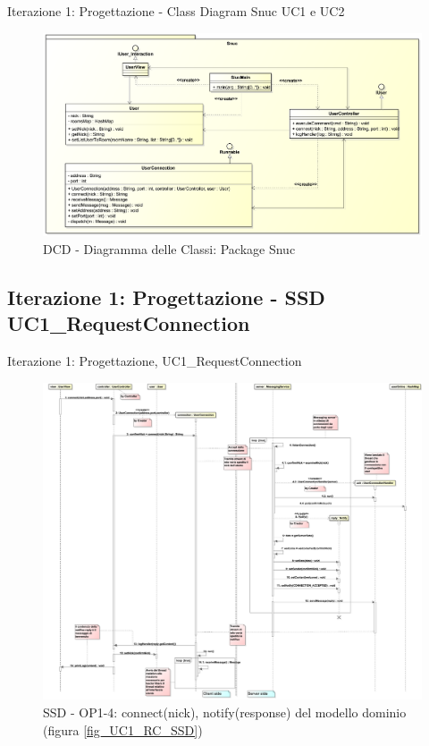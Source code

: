 \begin{frame} {Iterazione 1: Progettazione - Class Diagram Snuc UC1 e UC2}
   \begin{figure}
     \includegraphics[scale=0.17]{image_astah/Iteration_1_DesignModel/ClassDiagramSnuc.png}{\centering}
     \caption{DCD - Diagramma delle Classi: Package Snuc }
     \label{fig_UC1_UC2_DCD_3} 
   \end{figure}
\end{frame}

\subsection{Iterazione 1: Progettazione - SSD  UC1\_RequestConnection}
\begin{frame} {Iterazione 1: Progettazione, UC1\_RequestConnection}
   \begin{figure}
     \includegraphics[scale=0.065]{image_astah/Iteration_1_DesignModel/UC1_RequestConnection_SSD_3_4_connect.png}{\centering}
     \caption{SSD - OP1-4: connect(nick), notify(response) del modello dominio (figura \ref{fig_UC1_RC_SSD}) }
     \label{fig_UC1_SSD_RC_1_4} 
   \end{figure}
\end{frame}

